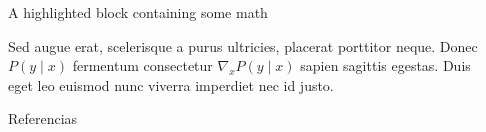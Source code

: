\documentclass[final]{beamer}
\newlength{\sepwidth}
\newlength{\colwidth}
\newcommand{\separatorcolumn}{\begin{column}{\sepwidth}\end{column}}
\begin{document}
\begin{frame}[t]
\begin{columns}[t]
\begin{column}{\colwidth}
\begin{exampleblock}{A highlighted block containing some math}

    Sed augue erat, scelerisque a purus ultricies, placerat porttitor neque.
    Donec $P(y \mid x)$ fermentum consectetur $\nabla_x P(y \mid x)$ sapien
    sagittis egestas. Duis eget leo euismod nunc viverra imperdiet nec id
    justo.

  \end{exampleblock}

 

  \begin{block}{Referencias}

    \nocite{*}
    \footnotesize{
      
      
    }

  \end{block}

\end{column}
\separatorcolumn



\end{columns}
\end{frame}
\end{document}
